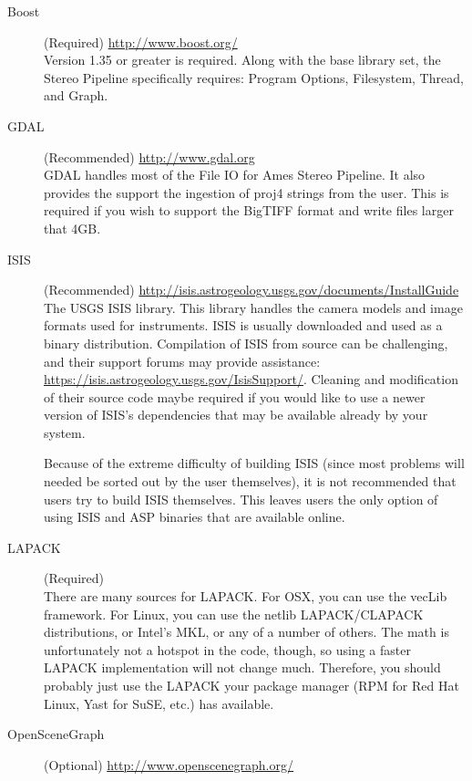 \begin{description}
\item [{Boost}] (Required) \url{http://www.boost.org/}\\
Version 1.35 or greater is required. Along with the base library
set, the Stereo Pipeline specifically requires: Program Options, Filesystem,
Thread, and Graph.

\item [{GDAL}] (Recommended) \url{http://www.gdal.org}\\

GDAL handles most of the File IO for Ames Stereo Pipeline. It also
provides the support the ingestion of proj4 strings from the
user. This is required if you wish to support the BigTIFF format and
write files larger that 4GB.

\item [{ISIS}] (Recommended) \url{http://isis.astrogeology.usgs.gov/documents/InstallGuide}\\

The \ac{USGS} \acf{ISIS} library. This library handles the camera
models and image formats used for instruments.  \ac{ISIS} is usually
downloaded and used as a binary distribution.  Compilation of
\ac{ISIS} from source can be challenging, and their support forums may
provide assistance:
\url{https://isis.astrogeology.usgs.gov/IsisSupport/}. Cleaning and
modification of their source code maybe required if you would like to
use a newer version of ISIS's dependencies that may be available already
by your system.

Because of the extreme difficulty of building ISIS (since most
problems will needed be sorted out by the user themselves), it is not
recommended that users try to build ISIS themselves. This leaves users
the only option of using ISIS and ASP binaries that are available
online.

\item [{LAPACK}] (Required)\\
There are many sources for LAPACK\@. For OSX, you can use the
vecLib framework. For Linux, you can use the netlib LAPACK/CLAPACK
distributions, or Intel's MKL, or any of a number of others. The math
is unfortunately not a hotspot in the code, though, so using a faster
LAPACK implementation will not change much. Therefore, you should
probably just use the LAPACK your package manager (RPM for Red Hat
Linux, Yast for SuSE, etc.) has available.

\item [{OpenSceneGraph}] (Optional) \url{http://www.openscenegraph.org/}\\


\end{description}
